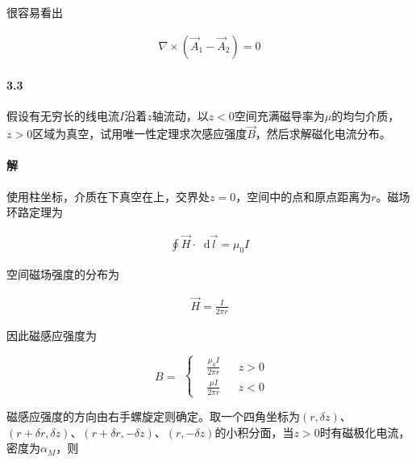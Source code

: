 \documentclass{article}
\newcommand*{\md}{\mathop{}\!\mathrm{d}}
\begin{document}
很容易看出

\begin{equation*}
  \begin{aligned}
    \nabla \times \left( \vec{A}_1 - \vec{A}_2 \right) = 0
  \end{aligned}
\end{equation*}

\paragraph{3.3}

假设有无穷长的线电流$I$沿着$z$轴流动，以$z<0$空间充满磁导率为$\mu$的均匀介质，$z>0$区域为真空，试用唯一性定理求次感应强度$\vec{B}$，然后求解磁化电流分布。

\paragraph{解}

使用柱坐标，介质在下真空在上，交界处$z=0$，空间中的点和原点距离为$r$。磁场环路定理为

\begin{equation*}
  \begin{aligned}
    \oint \vec{H} \cdot \md \vec{l} = \mu_0 I
  \end{aligned}
\end{equation*}

空间磁场强度的分布为

\begin{equation*}
  \begin{aligned}
    \vec{H} = \frac{I}{2 \pi r}
  \end{aligned}
\end{equation*}

因此磁感应强度为

\begin{equation*}
  \begin{aligned}
    B = 
  \end{aligned}
  \left\{
  \begin{aligned}
    & \frac{\mu_{0} I}{2\pi r} && z>0 \\
    & \frac{\mu I}{2 \pi r} && z<0
  \end{aligned}
  \right.
\end{equation*}

磁感应强度的方向由右手螺旋定则确定。取一个四角坐标为$(r,\delta z)$、$(r+\delta r, \delta z)$、$(r+\delta r, -\delta z)$、$(r, -\delta z)$的小积分面，当$z>0$时有磁极化电流，密度为$\alpha_M$，则
\end{document}
